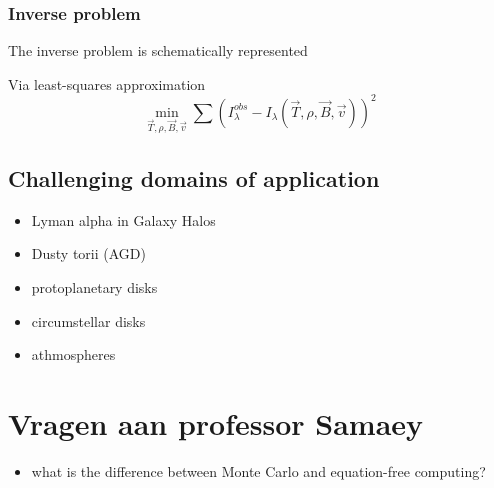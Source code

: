\documentclass[10pt,a4paper]{article}
\begin{document}
\noindent{}

\subsubsection*{Inverse problem}
The inverse problem is schematically represented
\begin{center}
\end{center}
Via least-squares approximation
\begin{equation}
\min_{\vec{T},\rho,\vec{B},\vec{v}} \sum \left( I_{\lambda}^{obs} - I_\lambda(\vec{T},\rho,\vec{B},\vec{v}) \right)^2
\end{equation}

\subsection{Challenging domains of application}
\begin{itemize}
\item Lyman alpha in Galaxy Halos
\item Dusty torii (AGD)
\item protoplanetary disks
\item circumstellar disks
\item athmospheres
\end{itemize}

\newpage
\section{Vragen aan professor Samaey}
\begin{itemize}
\item what is the difference between Monte Carlo and equation-free computing?
\end{itemize}
\end{document}
